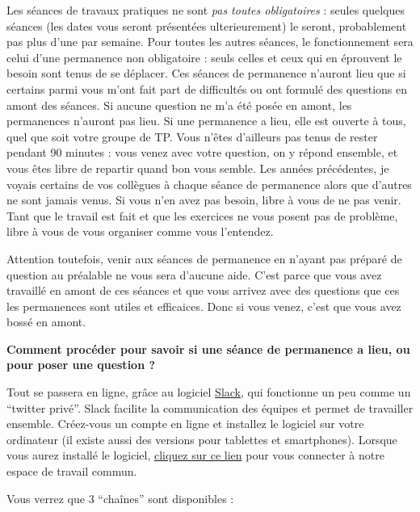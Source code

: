 \documentclass[a4paperpaper,]{article}
\theoremstyle{definition}
\theoremstyle{definition}
\theoremstyle{definition}
\theoremstyle{remark}
\begin{document}
Les séances de travaux pratiques ne sont \emph{pas toutes obligatoires}
: seules quelques séances (les dates vous seront présentées
ulterieurement) le seront, probablement pas plus d'une par semaine. Pour
toutes les autres séances, le fonctionnement sera celui d'une permanence
non obligatoire : seuls celles et ceux qui en éprouvent le besoin sont
tenus de se déplacer. Ces séances de permanence n'auront lieu que si
certains parmi vous m'ont fait part de difficultés ou ont formulé des
questions en amont des séances. Si aucune question ne m'a été posée en
amont, les permanences n'auront pas lieu. Si une permanence a lieu, elle
est ouverte à tous, quel que soit votre groupe de TP. Vous n'êtes
d'ailleurs pas tenus de rester pendant 90 minutes : vous venez avec
votre question, on y répond ensemble, et vous êtes libre de repartir
quand bon vous semble. Les années précédentes, je voyais certains de vos
collègues à chaque séance de permanence alors que d'autres ne sont
jamais venus. Si vous n'en avez pas besoin, libre à vous de ne pas
venir. Tant que le travail est fait et que les exercices ne vous posent
pas de problème, libre à vous de vous organiser comme vous l'entendez.

Attention toutefois, venir aux séances de permanence en n'ayant pas
préparé de question au préalable ne vous sera d'aucune aide. C'est parce
que vous avez travaillé en amont de ces séances et que vous arrivez avec
des questions que ces les permanences sont utiles et efficaices. Donc si
vous venez, c'est que vous avez bossé en amont.

\textbf{Comment procéder pour savoir si une séance de permanence a lieu,
ou pour poser une question ?}

Tout se passera en ligne, grâce au logiciel
\href{https://slack.com/intl/fr-fr/}{Slack}, qui fonctionne un peu comme
un ``twitter privé''. Slack facilite la communication des équipes et
permet de travailler ensemble. Créez-vous un compte en ligne et
installez le logiciel sur votre ordinateur (il existe aussi des versions
pour tablettes et smartphones). Lorsque vous aurez installé le logiciel,
\href{https://join.slack.com/t/geel-2018/shared_invite/enQtNDU2MDY0NzEwNzQzLWU4OTZiODNlOWI4YmIwZDY1MDZlYTg0YmU2OWU4MzFlNDc3YTdjOWU4NzQ3MjExYzIyNTljZGM4YmRkNjFhOGE}{cliquez
sur ce lien} pour vous connecter à notre espace de travail commun.

Vous verrez que 3 ``chaînes'' sont disponibles :
\end{document}
